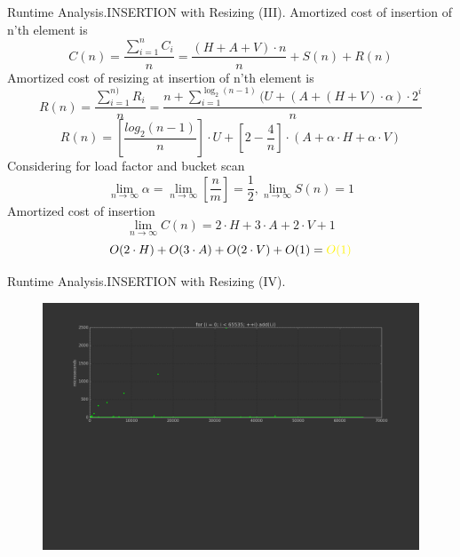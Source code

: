 \documentclass{beamer}
\begin{document}
\begin{frame}{Runtime Analysis.}{INSERTION with Resizing (III).}
  Amortized cost of insertion of n'th element is
  \begin{equation}
    C(n) = \frac{\sum_{i=1}^{n}C_i}{n} = \frac{(H+A+V)\cdot n}{n} + S(n) + R(n)
  \end{equation}
  Amortized cost of resizing at insertion of n'th element is
  \begin{equation}
    R(n) = \frac{\sum_{i=1}^{n)}R_i}{n} = \frac{n + \sum_{i=1}^{\log_2(n-1)}{(U+(A+(H+V)\cdot\alpha)\cdot2^i}}{n} 
  \end{equation}
  \begin{equation}
    R(n) = \left [\frac{log_2(n-1)}{n} \right ]\cdot U + \left [2-\frac{4}{n} \right ]\cdot (A+\alpha\cdot H + \alpha\cdot V) 
  \end{equation}
  Considering for load factor and bucket scan
  \begin{equation}
    \lim_{n \to \infty }\alpha= \lim_{n \to \infty }\left [\frac{n}{m} \right ] = \frac{1}{2},  
    \lim_{n \to \infty }S(n)= 1 
  \end{equation}
  Amortized cost of insertion
  \begin{equation}
    \lim_{n \to \infty }C(n)= 2\cdot H + 3\cdot A + 2\cdot V + 1 
  \end{equation}
  \begin{equation}
    O(2\cdot H)+O(3\cdot A)+O(2\cdot V)+O(1)=\color{yellow}O(1)
  \end{equation}
\end{frame}

\begin{frame}{Runtime Analysis.}{INSERTION with Resizing (IV).}
  \begin{figure}
    \includegraphics[scale=0.3]{pictures/insertion_amortized}
  \end{figure}
\end{frame}
\end{document}
